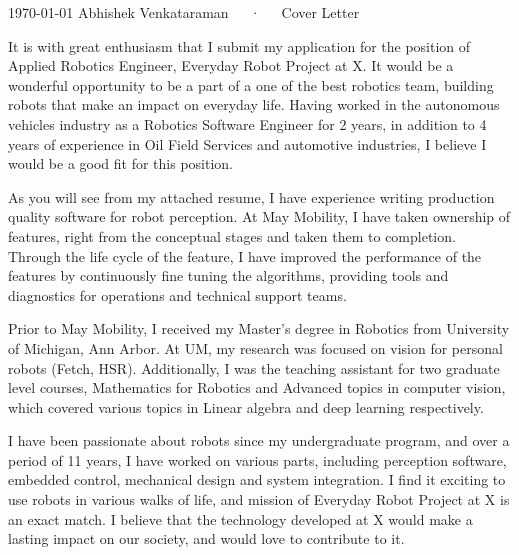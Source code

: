\documentclass[11pt, a4paper]{awesome-cv}
\begin{document}
\makecvheader[R]

\makecvfooter
  {\today}
  {Abhishek Venkataraman~~~·~~~Cover Letter}
  {}

\makelettertitle

\begin{cvletter}

It is with great enthusiasm that I submit my application for the position of Applied Robotics Engineer, Everyday Robot Project at X. It would be a wonderful opportunity to be a part of a one of the best robotics team, building robots that make an impact on everyday life. Having worked in the autonomous vehicles industry as a Robotics Software Engineer for 2 years, in addition to 4 years of experience in Oil Field Services and automotive industries, I believe I would be a good fit for this position.

As you will see from my attached resume, I have experience writing production quality software for robot perception. At May Mobility, I have taken ownership of features, right from the conceptual stages and taken them to completion. Through the life cycle of the feature, I have improved the performance of the features by continuously fine tuning the algorithms, providing tools and diagnostics for operations and technical support teams.

Prior to May Mobility, I received my Master's degree in Robotics from University of Michigan, Ann Arbor. At UM, my research was focused on vision for personal robots (Fetch, HSR). Additionally, I was the teaching assistant for two graduate level courses, Mathematics for Robotics and Advanced topics in computer vision, which covered various topics in Linear algebra and deep learning respectively. 

I have been passionate about robots since my undergraduate program, and over a period of 11 years, I have worked on various parts, including perception software, embedded control, mechanical design and system integration. I find it exciting to use robots in various walks of life, and mission of Everyday Robot Project at X is an exact match. I believe that the technology developed at X would make a lasting impact on our society, and would love to contribute to it.



\end{cvletter}


\makeletterclosing
\end{document}
